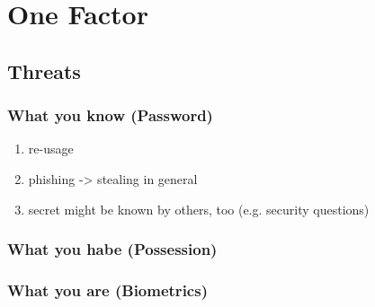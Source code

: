 \chapter{One Factor}


\section{Threats}
\label{one-factor-threats}

\subsection{What you know (Password)}

\begin{enumerate}
	\item re-usage
	\item phishing -> stealing in general
	\item secret might be known by others, too (e.g. security questions)
\end{enumerate}


\subsection{What you habe (Possession)}

\subsection{What you are (Biometrics)}
